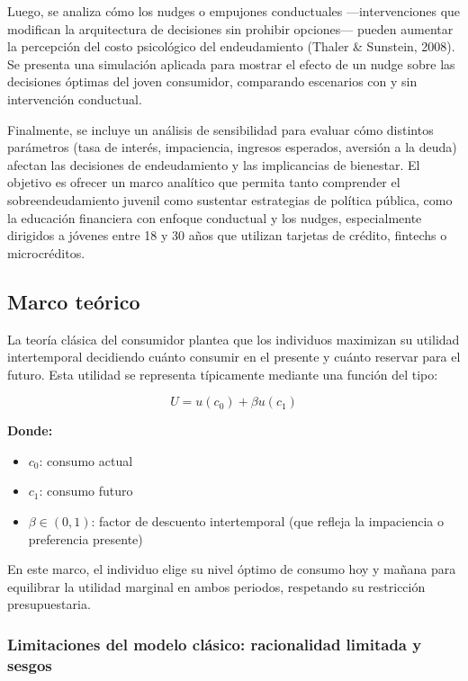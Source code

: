 \documentclass[10pt]{article}
\begin{document}
\begin{multicols}{2}
Luego, se analiza cómo los nudges o empujones conductuales —intervenciones que modifican la arquitectura de decisiones sin prohibir opciones— pueden aumentar la percepción del costo psicológico del endeudamiento (Thaler & Sunstein, 2008). Se presenta una simulación aplicada para mostrar el efecto de un nudge sobre las decisiones óptimas del joven consumidor, comparando escenarios con y sin intervención conductual.

Finalmente, se incluye un análisis de sensibilidad para evaluar cómo distintos parámetros (tasa de interés, impaciencia, ingresos esperados, aversión a la deuda) afectan las decisiones de endeudamiento y las implicancias de bienestar. El objetivo es ofrecer un marco analítico que permita tanto comprender el sobreendeudamiento juvenil como sustentar estrategias de política pública, como la educación financiera con enfoque conductual y los nudges, especialmente dirigidos a jóvenes entre 18 y 30 años que utilizan tarjetas de crédito, fintechs o microcréditos.

\subsection{Marco teórico}

La teoría clásica del consumidor plantea que los individuos maximizan su utilidad intertemporal decidiendo cuánto consumir en el presente y cuánto reservar para el futuro. Esta utilidad se representa típicamente mediante una función del tipo:

\begin{equation}
U = u(c_0) + \beta u(c_1)
\end{equation}

\noindent \textbf{Donde:}
\begin{itemize}
    \item $c_0$: consumo actual
    \item $c_1$: consumo futuro
    \item $\beta \in (0,1)$: factor de descuento intertemporal (que refleja la impaciencia o preferencia presente)
\end{itemize}

En este marco, el individuo elige su nivel óptimo de consumo hoy y mañana para equilibrar la utilidad marginal en ambos periodos, respetando su restricción presupuestaria.

\subsubsection*{Limitaciones del modelo clásico: racionalidad limitada y sesgos}


\end{multicols}
\end{document}
